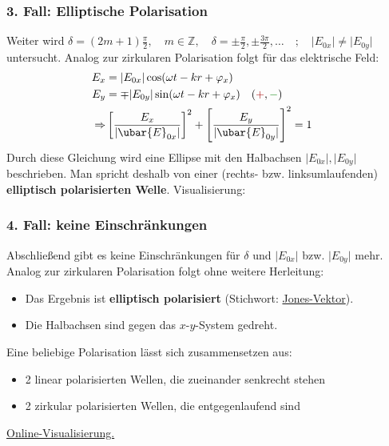  \subsubsection{3. Fall: Elliptische Polarisation}
	  Weiter wird \(\delta = (2m+1) \frac{\pi}{2}, \quad m \in \mathbb{Z} , \quad\delta = \pm \frac{\pi}{2}, \pm \frac{3\pi}{2},\ldots \quad ;\quad\vert E_{0x} \vert \neq \vert E_{0y} \vert  \) untersucht. Analog zur zirkularen Polarisation folgt für das elektrische Feld:
		        \begin{equation}\begin{split}
				        E_x &= \vert E_{0x} \vert \cos (\omega t -  k r + \varphi_x)\\
				        E_y &= \mp \vert E_{0y} \vert \sin (\omega t -  k r + \varphi_x) \quad (\textcolor{red}{+},\textcolor{green}{-})\\
				        \Rightarrow &\left[ \frac{E_x}{\vert \ubar{E}_{0x}\vert}\right]^2+\left[\frac{E_y}{\vert \ubar{E}_{0y}\vert}\right]^2 = 1\quad
			        \end{split}\end{equation}
		Durch diese Gleichung wird eine Ellipse mit den Halbachsen $\vert E_{0x} \vert , \vert E_{0y} \vert$ beschrieben. Man spricht deshalb von einer (rechts- bzw. linksumlaufenden) \textbf{elliptisch polarisierten Welle}. Visualisierung:
		        \begin{center}
			        
		        \end{center}
  \subsubsection{4. Fall: keine Einschränkungen}
		  Abschließend gibt es keine Einschränkungen für \(\delta\) und \(\vert E_{0x} \vert\) bzw. \(\vert E_{0y} \vert  \) mehr. Analog zur zirkularen Polarisation folgt ohne weitere Herleitung:
		        \begin{itemize}
			        \item Das Ergebnis ist \textbf{elliptisch polarisiert} (Stichwort: \href{https://en.wikipedia.org/wiki/Jones_calculus}{Jones-Vektor}).
			        \item Die Halbachsen sind gegen das \(x\)-\(y\)-System gedreht.
			              \begin{center}
				              
			              \end{center}
		        \end{itemize}
		       Eine beliebige Polarisation lässt sich zusammensetzen aus:
		        \begin{itemize}
			        \item 2 linear polarisierten Wellen, die zueinander senkrecht stehen
			        \item 2 zirkular polarisierten Wellen, die entgegenlaufend sind
		        \end{itemize}
		        \href{https://emanim.szialab.org}{Online-Visualisierung.}
